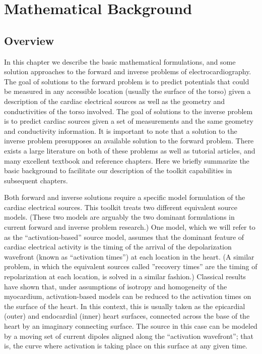 \chapter{Mathematical Background} \label{sec:math}

\section{Overview}

In this chapter we describe the basic mathematical formulations, and some
solution approaches to the forward and inverse problems of
electrocardiography. The goal of solutions to the forward problem is to
predict potentials that could be measured in any accessible location
(usually the surface of the torso) given a description of the cardiac
electrical sources as well as the geometry and conductivities of the torso involved. The goal of
solutions to the inverse problem is to predict cardiac sources given a set
of measurements and the same geometry and conductivity information. It is
important to note that a solution to the inverse problem presupposes an
available solution to the forward problem. There exists a large literature on
both of these problems as well as tutorial articles, and many excellent textbook
and reference chapters. Here we briefly summarize the
basic background to facilitate our description of the toolkit capabilities
in subsequent chapters.

Both forward and inverse solutions require a specific model formulation of
the cardiac electrical sources. This toolkit treats two different
equivalent source models. (These two models are arguably the two dominant
formulations in current forward and inverse problem research.) One model,
which we will refer to as the ``activation-based'' source model, assumes
that the dominant feature of cardiac electrical activity is the timing of
the arrival of the depolarization wavefront (known as ``activation times'')
at each location in the heart. (A similar problem, in which the equivalent sources called ''recovery times'' are the timing of
repolarization at each location, is solved in a
similar fashion.) Classical
results have shown that, under assumptions of isotropy and homogeneity of
the myocardium, activation-based models can be reduced to the activation
times on the surface of the heart. In this context, this is usually taken as
the epicardial (outer) and endocardial (inner) heart surfaces, connected
across the base of the heart by an imaginary connecting surface. The source
in this case can be modeled by a moving set of current dipoles aligned
along the ``activation wavefront''; that is, the curve where activation is
taking place on this surface at any given time.

